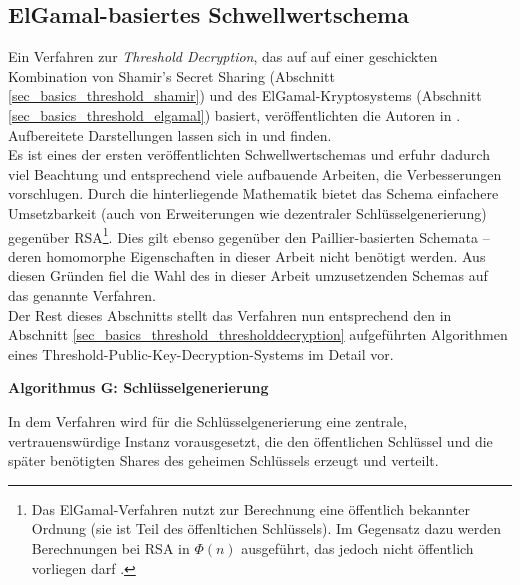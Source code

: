 \subsection{ElGamal-basiertes Schwellwertschema}

\label{sec_state_threshold_scheme}

Ein Verfahren zur \textit{Threshold Decryption}, das auf auf einer geschickten Kombination von Shamir's Secret Sharing (Abschnitt \ref{sec_basics_threshold_shamir}) und des ElGamal-Kryptosystems (Abschnitt \ref{sec_basics_threshold_elgamal}) basiert, veröffentlichten die Autoren in \cite{DesmedtFrankel1990}. Aufbereitete Darstellungen lassen sich in \cite{katz2014} und \cite{boneh2016} finden. \\
Es ist eines der ersten veröffentlichten Schwellwertschemas und erfuhr dadurch viel Beachtung und entsprechend viele aufbauende Arbeiten, die Verbesserungen vorschlugen. Durch die hinterliegende Mathematik bietet das Schema einfachere Umsetzbarkeit (auch von Erweiterungen wie dezentraler Schlüsselgenerierung) gegenüber RSA\footnote{
  Das ElGamal-Verfahren nutzt zur Berechnung eine öffentlich bekannter Ordnung (sie ist Teil des öffenltichen Schlüssels). Im Gegensatz dazu werden Berechnungen bei RSA in \(\Phi(n)\) ausgeführt, das jedoch nicht öffentlich vorliegen darf \cite{nguyen2005}.
}. Dies gilt ebenso gegenüber den Paillier-basierten Schemata -- deren homomorphe Eigenschaften in dieser Arbeit nicht benötigt werden. Aus diesen Gründen fiel die Wahl des in dieser Arbeit umzusetzenden Schemas auf das genannte Verfahren.\\
Der Rest dieses Abschnitts stellt das Verfahren nun entsprechend den in Abschnitt \ref{sec_basics_threshold_thresholddecryption} aufgeführten Algorithmen eines Threshold-Public-Key-Decryption-Systems im Detail vor.





\textbf{Algorithmus G: Schlüsselgenerierung}

In dem Verfahren wird für die Schlüsselgenerierung eine zentrale, vertrauenswürdige Instanz vorausgesetzt, die den öffentlichen Schlüssel und die später benötigten Shares des geheimen Schlüssels erzeugt und verteilt. 

